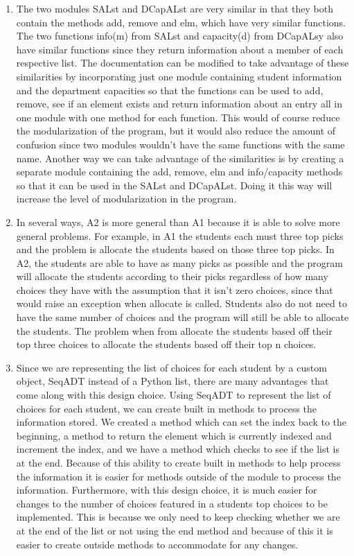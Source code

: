 \documentclass[12pt]{article}
\begin{document}
\begin{enumerate}
\item The two modules SALst and DCapALst are very similar in that they both contain the methods add, remove and elm, which have very similar functions. The two functions info(m) from SALst and capacity(d) from DCapALsy also have similar functions since they return information about a member of each respective list. The documentation can be modified to take advantage of these similarities by incorporating just one module containing student information and the department capacities so that the functions can be used to add, remove, see if an element exists and return information about an entry all in one module with one method for each function. This would of course reduce the modularization of the program, but it would also reduce the amount of confusion since two modules wouldn’t have the same functions with the same name. Another way we can take advantage of the similarities is by creating a separate module containing the add, remove, elm and info/capacity methods so that it can be used in the SALst and DCapALst. Doing it this way will increase the level of modularization in the program.

\item In several ways, A2 is more general than A1 because it is able to solve more general problems. For example, in A1 the students each must three top picks and the problem is allocate the students based on those three top picks. In A2, the students are able to have as many picks as possible and the program will allocate the students according to their picks regardless of how many choices they have with the assumption that it isn’t zero choices, since that would raise an exception when allocate is called. Students also do not need to have the same number of choices and the program will still be able to allocate the students. The problem when from allocate the students based off their top three choices to allocate the students based off their top n choices.

\item Since we are representing the list of choices for each student by a custom object, SeqADT instead of a Python list, there are many advantages that come along with this design choice. Using SeqADT to represent the list of choices for each student, we can create built in methods to process the information stored. We created a method which can set the index back to the beginning, a method to return the element which is currently indexed and increment the index, and we have a method which checks to see if the list is at the end. Because of this ability to create built in methods to help process the information it is easier for methods outside of the module to process the information. Furthermore, with this design choice, it is much easier for changes to the number of choices featured in a students top choices to be implemented. This is because we only need to keep checking whether we are at the end of the list or not using the end method and because of this it is easier to create outside methods to accommodate for any changes.


\end{enumerate}
\end{document}
